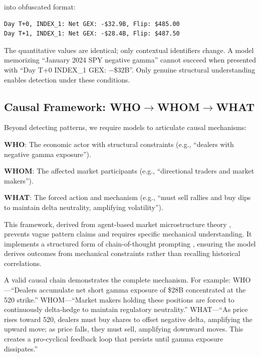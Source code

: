 \noindent into obfuscated format:

\begin{small}
\begin{verbatim}
Day T+0, INDEX_1: Net GEX: -$32.9B, Flip: $485.00
Day T+1, INDEX_1: Net GEX: -$28.4B, Flip: $487.50
\end{verbatim}
\end{small}

The quantitative values are identical; only contextual identifiers change. A model memorizing ``January 2024 SPY negative gamma'' cannot succeed when presented with ``Day T+0 INDEX\_1 GEX: $-$\$32B''. Only genuine structural understanding enables detection under these conditions.

\subsection{Causal Framework: \texorpdfstring{WHO$\rightarrow$WHOM$\rightarrow$WHAT}{WHO->WHOM->WHAT}}
\label{subsec:causal}

Beyond detecting patterns, we require models to articulate causal mechanisms:

\textbf{WHO}: The economic actor with structural constraints (e.g., ``dealers with negative gamma exposure'').

\textbf{WHOM}: The affected market participants (e.g., ``directional traders and market makers'').

\textbf{WHAT}: The forced action and mechanism (e.g., ``must sell rallies and buy dips to maintain delta neutrality, amplifying volatility'').

This framework, derived from agent-based market microstructure theory \citep{grossman1988liquidity,garleanu2009demand}, prevents vague pattern claims and requires specific mechanical understanding. It implements a structured form of chain-of-thought prompting \citep{wei2022chain}, ensuring the model derives outcomes from mechanical constraints rather than recalling historical correlations.

A valid causal chain demonstrates the complete mechanism. For example: WHO---``Dealers accumulate net short gamma exposure of \$28B concentrated at the 520 strike.'' WHOM---``Market makers holding these positions are forced to continuously delta-hedge to maintain regulatory neutrality.'' WHAT---``As price rises toward 520, dealers must buy shares to offset negative delta, amplifying the upward move; as price falls, they must sell, amplifying downward moves. This creates a pro-cyclical feedback loop that persists until gamma exposure dissipates.''

